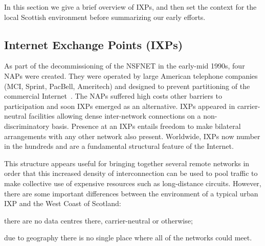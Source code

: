 In this section we give a brief overview of \acp{IXP}, and then set the context for the local Scottish environment before summarizing our early efforts.

\subsection{Internet Exchange Points (IXPs)}

As part of the decommissioning of the \ac{NSFNET} in the early-mid
1990s, four \acp{NAP} were created. They were operated by large
American telephone companies (MCI, Sprint, PacBell, Ameritech) and
designed to prevent partitioning of the commercial
Internet~\cite{hayes1997computing,Ager:2012}. The \acp{NAP} suffered
high costs other barriers to participation and soon \acp{IXP} emerged
as an alternative. \acp{IXP} appeared in carrier-neutral facilities
allowing dense inter-network connections on a non-discriminatory
basis. Presence at an \acp{IXP} entails freedom to make bilateral
arrangements with any other network also present. Worldwide, \acp{IXP}
now number in the hundreds and are a fundamental structural feature of
the Internet.



This structure appears useful for bringing together several remote
networks in order that this increased density of interconnection can
be used to pool traffic to make collective use of expensive resources
such as long-distance circuits. However, there are some important
differences between the environment of a typical urban \ac{IXP} and
the West Coast of Scotland:
\begin{inparaenum}[(i)]
  \item there are no data centres there, carrier-neutral or otherwise;
  \item due to geography there is no single place where all of the
    networks could meet.
\end{inparaenum}

